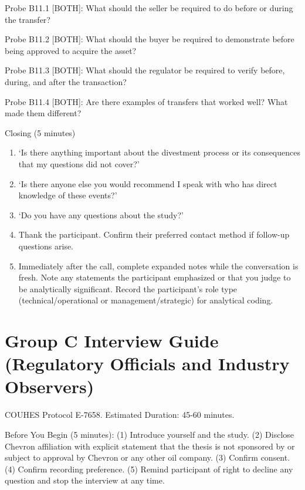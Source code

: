 \documentclass[twoside,fontset=lmodern]{mitthesis}
\begin{document}
Probe B11.1 {[}BOTH{]}: What should the seller be required to do before
or during the transfer?

Probe B11.2 {[}BOTH{]}: What should the buyer be required to demonstrate
before being approved to acquire the asset?

Probe B11.3 {[}BOTH{]}: What should the regulator be required to verify
before, during, and after the transaction?

Probe B11.4 {[}BOTH{]}: Are there examples of transfers that worked
well? What made them different?

Closing (5 minutes)

\begin{enumerate}
\def\labelenumi{\arabic{enumi}.}
\item
  `Is there anything important about the divestment process or its
  consequences that my questions did not cover?'
\item
  `Is there anyone else you would recommend I speak with who has direct
  knowledge of these events?'
\item
  `Do you have any questions about the study?'
\item
  Thank the participant. Confirm their preferred contact method if
  follow-up questions arise.
\item
  Immediately after the call, complete expanded notes while the
  conversation is fresh. Note any statements the participant emphasized
  or that you judge to be analytically significant. Record the
  participant's role type (technical/operational or
  management/strategic) for analytical coding.
\end{enumerate}

\hypertarget{group-c-interview-guide-regulatory-officials-and-industry-observers}{%
\section{Group C Interview Guide (Regulatory Officials and Industry
Observers)}\label{group-c-interview-guide-regulatory-officials-and-industry-observers}}

COUHES Protocol E-7658. Estimated Duration: 45-60 minutes.

Before You Begin (5 minutes): (1) Introduce yourself and the study. (2)
Disclose Chevron affiliation with explicit statement that the thesis is
not sponsored by or subject to approval by Chevron or any other oil
company. (3) Confirm consent. (4) Confirm recording preference. (5)
Remind participant of right to decline any question and stop the
interview at any time.
\end{document}
